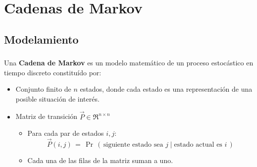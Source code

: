 \documentclass[ 10pt, xcolor = dvipsnames]{beamer}
\begin{document}
\section{Cadenas de Markov}

\subsection{Modelamiento}

\begin{frame}[allowframebreaks]
\frametitle{\insertsubsection}

Una \textbf{Cadena de Markov} es un modelo matem\'atico de un proceso estoc\'astico \linebreak en tiempo discreto constitu\'ido por: 
\begin{itemize}
\item Conjunto finito de $n$ estados, donde cada estado es una representaci\'on de una posible situaci\'on de inter\'es. 
\item Matriz de transici\'on $\vec{P} \in \Re^{n \times n}$
\begin{itemize}
\item Para cada par de estados $i,j$: 
\[
\vec{P}(i,j) \, = \, 
\Pr \, ( \, 
\text{siguiente estado sea } j \mid
\text{estado actual es } i \, )
\]
\item Cada una de las filas de la matriz suman a uno. 
\end{itemize}
\end{itemize}

\end{frame}
\end{document}
